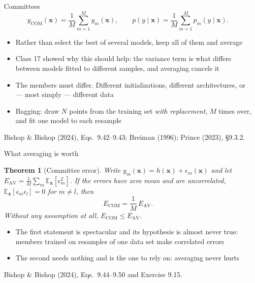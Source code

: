 \documentclass[aspectratio=169, 11pt]{beamer}
\newtheorem{thmx}[theorem]{Theorem}
\newcommand{\srcline}[1]{%
  \par\vspace{0.25em}%
  {\scriptsize\color{mcMuted}\hfill #1\par}}
\begin{document}
\begin{frame}{Committees}
  \vspace{-0.2em}
  \[
    y_{\mathrm{COM}}(\mathbf{x}) = \frac{1}{M}\sum_{m=1}^{M} y_m(\mathbf{x}),
    \qquad
    p(y \mid \mathbf{x}) = \frac{1}{M}\sum_{m=1}^{M} p_m(y \mid \mathbf{x}) .
  \]
  \vspace{-0.5em}
  {\footnotesize
  \begin{itemize}\itemsep0.26em
    \item Rather than select the best of several models, keep all of
          them and average
    \item Class 17 showed why this should help: the \alert{variance}
          term is what differs between models fitted to different
          samples, and averaging cancels it
    \item The members must differ. Different initializations, different
          architectures, or --- most simply --- different data
    \item \alert{Bagging}: draw $N$ points from the training set
          \emph{with replacement}, $M$ times over, and fit one model to
          each resample
  \end{itemize}}
  \srcline{Bishop \& Bishop (2024), Eqs.~9.42--9.43; Breiman (1996);
  Prince (2023), \S9.3.2.}
\end{frame}

\begin{frame}{What averaging is worth}
  \vspace{-0.3em}
  \begin{thmx}[Committee error]\label{th:com}
    \small
    Write $y_m(\mathbf{x}) = h(\mathbf{x}) + \epsilon_m(\mathbf{x})$ and let
    $E_{\mathrm{AV}} = \frac{1}{M}\sum_m \mathbb{E}_{\mathbf{x}}[\epsilon_m^2]$.
    If the errors have zero mean and are uncorrelated,
    $\mathbb{E}_{\mathbf{x}}[\epsilon_m \epsilon_l] = 0$ for $m \neq l$, then
    \[
      E_{\mathrm{COM}} = \frac{1}{M}\, E_{\mathrm{AV}} .
    \]
    Without any assumption at all,
    $E_{\mathrm{COM}} \leq E_{\mathrm{AV}}$.
  \end{thmx}
  \vspace{0.2em}
  \begin{itemize}\itemsep0.24em
    \item The first statement is spectacular and its hypothesis is
          almost never true: members trained on resamples of one data
          set make \alert{correlated} errors
    \item The second needs nothing and is the one to rely on: averaging
          never hurts
  \end{itemize}
  \srcline{Bishop \& Bishop (2024), Eqs.~9.44--9.50 and Exercise 9.15.}
\end{frame}
\end{document}
